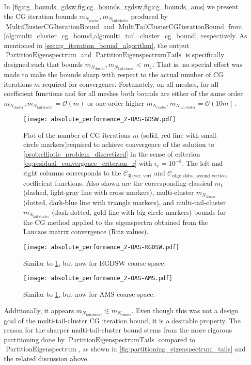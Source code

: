 In \cref{fig:cg_bounds_gdsw,fig:cg_bounds_rgdsw,fig:cg_bounds_ams} we present the CG iteration bounds $m_{N_{\text{cluster}}}, m_{N_{\text{tail-cluster}}}$ produced by $\operatorname{MultiClusterCGIterationBound}$ and $\operatorname{MultiTailClusterCGIterationBound}$ from \cref{alg:multi_cluster_cg_bound,alg:multi_tail_cluster_cg_bound}, respectively. As mentioned in \cref{sec:cg_iteration_bound_algorithm}, the output $\operatorname{PartitionEigenspectrum}$ and $\operatorname{PartitionEigenspectrumTails}$ is specifically designed such that bounds $m_{N_{\text{cluster}}}, m_{N_{\text{tail-cluster}}} < m_1$. That is, no special effort was made to make the bounds sharp with respect to the actual number of CG iterations $m$ required for convergence. Fortunately, on all meshes, for all coefficient functions and for all meshes both bounds are either of the same order $m_{N_{\text{cluster}}}, m_{N_{\text{tail-cluster}}} = \mathcal{O}(m)$ or one order higher $m_{N_{\text{cluster}}}, m_{N_{\text{tail-cluster}}} = \mathcal{O}(10m)$.
\begin{figure}[H]
    \centering
    \texttt{[image: absolute\_performance\_2-OAS-GDSW.pdf]}
    \caption{Plot of the number of CG iterations $m$ (solid, red line with small circle markers)required to achieve convergence of the solution to \cref{prob:elliptic_problem_discretized} in the sense of criterion \cref{eq:residual_convergence_criterion_r} with $\epsilon_r=10^{-8}$. The left and right columns corresponds to the $\mathcal{C}_{\text{3layer, vert}}$ and $\mathcal{C}_{\text{edge slabs, around vertices}}$ coefficient functions. Also shown are the corresponding classical $m_1$ (dashed, light-gray line with cross markers), multi-cluster $m_{N_{\text{cluster}}}$ (dotted, dark-blue line with triangle markers), and multi-tail-cluster $m_{N_{\text{tail-cluster}}}$ (dash-dotted, gold line with big circle markers) bounds for the CG method applied to the eigenspectra obtained from the Lanczos matrix convergence (Ritz values).}
    \label{fig:cg_bounds_gdsw}
\end{figure}
\begin{figure}[H]
    \centering\texttt{[image: absolute\_performance\_2-OAS-RGDSW.pdf]}
    \caption{Similar to \cref{fig:cg_bounds_gdsw}, but now for RGDSW coarse space.}
    \label{fig:cg_bounds_rgdsw}
\end{figure}
\begin{figure}[H]
    \centering\texttt{[image: absolute\_performance\_2-OAS-AMS.pdf]}
    \caption{Similar to \cref{fig:cg_bounds_gdsw}, but now for AMS coarse space.}
    \label{fig:cg_bounds_ams}
\end{figure}
Additionally, it appears $m_{N_{\text{tail-cluster}}} \lesssim m_{N_{\text{cluster}}}$. Even though this was not a design goal of the multi-tail-cluster CG iteration bound, it is a desirable property. The reason for the sharper multi-tail-cluster bound stems from the more rigorous partitioning done by $\operatorname{PartitionEigenspectrumTails}$ compared to $\operatorname{PartitionEigenspectrum}$, as shown in \cref{fig:partitioning_eigenspectrum_tails} and the related discussion above.

